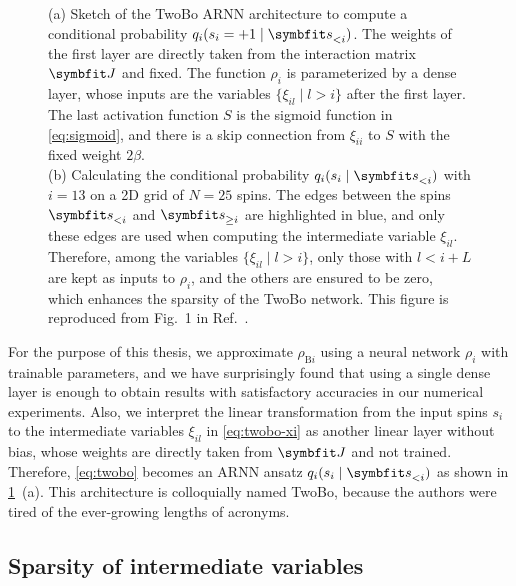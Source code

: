 \begin{figure}[htb]
\centering
\hspace*{\fill}
\hspace*{\fill}
\hspace*{\fill}
\caption[Architecture of the sparse two-body ARNN (TwoBo)]{
(a) Sketch of the TwoBo ARNN architecture to compute a conditional probability $q_i(s_i = +1 \mid \vs_{< i})$.
The weights of the first layer are directly taken from the interaction matrix $\mJ$ and fixed.
The function $\rho_i$ is parameterized by a dense layer, whose inputs are the variables $\{\xi_{i l} \mid l > i\}$ after the first layer.
The last activation function $S$ is the sigmoid function in \cref{eq:sigmoid}, and there is a skip connection from $\xi_{i i }$ to $S$ with the fixed weight $2 \beta$. \\
(b) Calculating the conditional probability $q_i(s_i \mid \vs_{< i})$ with $i = 13$ on a 2D grid of $N = 25$ spins. The edges between the spins $\vs_{< i}$ and $\vs_{\ge i}$ are highlighted in blue, and only these edges are used when computing the intermediate variable $\xi_{i l}$. Therefore, among the variables $\{\xi_{i l} \mid l > i\}$, only those with $l < i + L$ are kept as inputs to $\rho_i$, and the others are ensured to be zero, which enhances the sparsity of the TwoBo network.
This figure is reproduced from Fig.~1 in Ref.~\cite{biazzo2024sparse}.
}
\label{fig:twobo-arch-grid}
\end{figure}

For the purpose of this thesis, we approximate $\rho_{\text{B} i}$ using a neural network $\rho_i$ with trainable parameters, and we have surprisingly found that using a single dense layer is enough to obtain results with satisfactory accuracies in our numerical experiments. Also, we interpret the linear transformation from the input spins $s_i$ to the intermediate variables $\xi_{i l}$ in \cref{eq:twobo-xi} as another linear layer without bias, whose weights are directly taken from $\mJ$ and not trained. Therefore, \cref{eq:twobo} becomes an ARNN ansatz $q_i(s_i \mid \vs_{< i})$ as shown in \cref{fig:twobo-arch-grid}~(a). This architecture is colloquially named TwoBo, because the authors were tired of the ever-growing lengths of acronyms.

\subsection{Sparsity of intermediate variables}
\label{sec:twobo-sparse}

